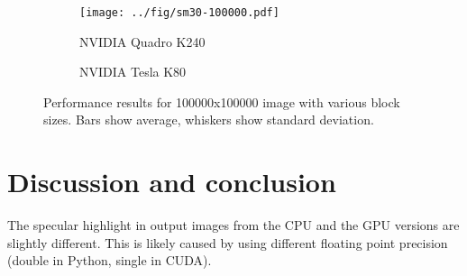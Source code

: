 \documentclass{article}
\begin{document}
\begin{figure}
    \begin{subfigure}{\linewidth}
        \texttt{[image: ../fig/sm30-100000.pdf]}
        \caption{NVIDIA Quadro K240}
    \end{subfigure}
    \begin{subfigure}{\linewidth}
        \caption{NVIDIA Tesla K80}
    \end{subfigure}
    \caption{Performance results for 100000x100000 image with various block
        sizes. Bars show average, whiskers show
    standard deviation.}
\end{figure}

\section{Discussion and conclusion}

The specular highlight in output images from the CPU and the GPU versions are
slightly different. This is likely caused by using different floating
point precision (double in Python, single in CUDA).
\end{document}
